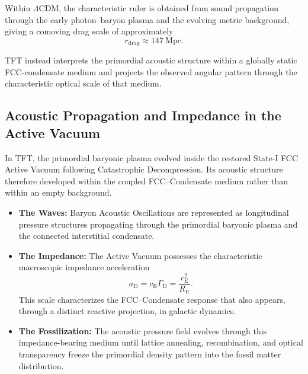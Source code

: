 Within $\Lambda$CDM, the characteristic ruler is obtained from sound propagation through the early photon--baryon plasma and the evolving metric background, giving a comoving drag scale of approximately
\begin{equation}
    r_{\mathrm{drag}}
    \approx
    147\ \mathrm{Mpc}.
\end{equation}

TFT instead interprets the primordial acoustic structure within a globally static FCC-condensate medium and projects the observed angular pattern through the characteristic optical scale of that medium.


\subsection{Acoustic Propagation and Impedance in the Active Vacuum}
\label{sec:viscous_acoustic_damping}

In TFT, the primordial baryonic plasma evolved inside the restored State-I FCC Active Vacuum following Catastrophic Decompression. Its acoustic structure therefore developed within the coupled FCC--Condensate medium rather than within an empty background.

\begin{itemize}

    \item \textbf{The Waves:}
    Baryon Acoustic Oscillations are represented as longitudinal pressure structures propagating through the primordial baryonic plasma and the connected interstitial condensate.

    \item \textbf{The Impedance:}
    The Active Vacuum possesses the characteristic macroscopic impedance acceleration
    \begin{equation}
        a_{\mathrm D}
        =
        c_{\mathrm E}\Gamma_{\mathrm D}
        =
        \frac{c_{\mathrm E}^2}{R_{\mathrm U}}.
    \end{equation}
    This scale characterizes the FCC--Condensate response that also appears, through a distinct reactive projection, in galactic dynamics.

    \item \textbf{The Fossilization:}
    The acoustic pressure field evolves through this impedance-bearing medium until lattice annealing, recombination, and optical transparency freeze the primordial density pattern into the fossil matter distribution.

\end{itemize}

